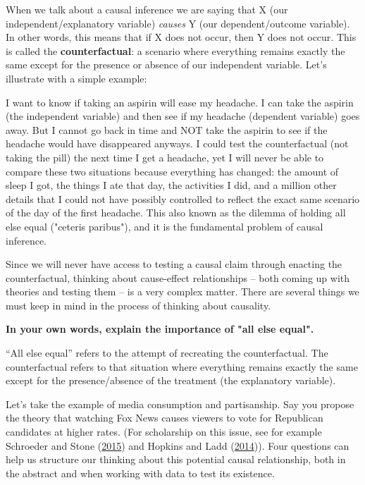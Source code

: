 \documentclass{book}
\newenvironment{shaded*}{
    \begin{center}
    \begin{tabular}{|p{0.9\textwidth}|}
    \hline\\
    }
    { 
    \\\\\hline
    \end{tabular} 
    \end{center}
}
\begin{document}
When we talk about a causal inference we are saying that X (our
independent/explanatory variable) \emph{causes} Y (our dependent/outcome
variable). In other words, this means that if X does not occur, then Y does
not occur. This is called the \textbf{counterfactual}: a scenario where
everything remains exactly the same except for the presence or absence of our
independent variable. Let's illustrate with a simple example:

I want to know if taking an aspirin will ease my headache. I can take the
aspirin (the independent variable) and then see if my headache (dependent
variable) goes away. But I cannot go back in time and NOT take the aspirin to
see if the headache would have disappeared anyways. I could test the
counterfactual (not taking the pill) the next time I get a headache, yet I
will never be able to compare these two situations because everything has
changed: the amount of sleep I got, the things I ate that day, the activities
I did, and a million other details that I could not have possibly controlled
to reflect the exact same scenario of the day of the first headache. This also
known as the dilemma of holding all else equal ("ceteris paribus"), and it is
the fundamental problem of causal inference.

Since we will never have access to testing a causal claim through enacting the
counterfactual, thinking about cause-effect relationships -- both coming up
with theories and testing them -- is a very complex matter. There are several
things we must keep in mind in the process of thinking about causality.

\textbf{In your own words, explain the importance of "all else equal".}

\begin{shaded*}

``All else equal'' refers to the attempt of recreating the counterfactual. The
counterfactual refers to that situation where everything remains exactly the
same except for the presence/absence of the treatment (the explanatory
variable).

\end{shaded*}

Let's take the example of media consumption and partisanship. Say you propose
the theory that watching Fox News causes viewers to vote for Republican
candidates at higher rates. (For scholarship on this issue, see for example
Schroeder and Stone
(\protect\hyperlink{ref-schroederFoxNewsPolitical2015}{2015}) and Hopkins and
Ladd (\protect\hyperlink{ref-hopkinsConsequencesBroaderMedia2014}{2014})).
Four questions can help us structure our thinking about this potential causal
relationship, both in the abstract and when working with data to test its
existence.
\end{document}
